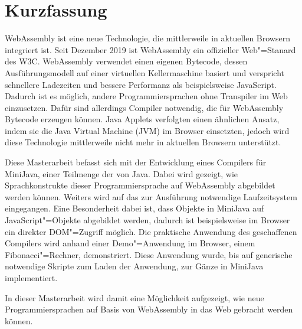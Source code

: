 \chapter{Kurzfassung}

WebAssembly ist eine neue Technologie, die mittlerweile in aktuellen Browsern integriert ist. Seit Dezember 2019 ist WebAssembly ein offizieller Web"=Stanard des W3C. WebAssembly verwendet einen eigenen Bytecode, dessen Ausführungsmodell auf einer virtuellen Kellermaschine basiert und verspricht schnellere Ladezeiten und bessere Performanz als beispielsweise JavaScript. Dadurch ist es möglich, andere Programmiersprachen ohne Transpiler im Web einzusetzen. Dafür sind allerdings Compiler notwendig, die für WebAssembly Bytecode erzeugen können. Java Applets verfolgten einen ähnlichen Ansatz, indem sie die Java Virtual Machine (JVM) im Browser einsetzten, jedoch wird diese Technologie mittlerweile nicht mehr in aktuellen Browsern unterstützt.

Diese Masterarbeit befasst sich mit der Entwicklung eines Compilers für MiniJava, einer Teilmenge der von Java. Dabei wird gezeigt, wie Sprachkonstrukte dieser Programmiersprache auf WebAssembly abgebildet werden können. Weiters wird auf das zur Ausführung notwendige Laufzeitsystem eingegangen. Eine Besonderheit dabei ist, dass Objekte in MiniJava auf JavaScript"=Objekte abgebildet werden, dadurch ist beispielsweise im Browser ein direkter DOM"=Zugriff möglich. Die praktische Anwendung des geschaffenen Compilers wird anhand einer Demo"=Anwendung im Browser, einem Fibonacci"=Rechner, demonstriert. Diese Anwendung wurde, bis auf generische notwendige Skripte zum Laden der Anwendung, zur Gänze in MiniJava implementiert.

In dieser Masterarbeit wird damit eine Möglichkeit aufgezeigt, wie neue Programmiersprachen auf Basis von WebAssembly in das Web gebracht werden können.
